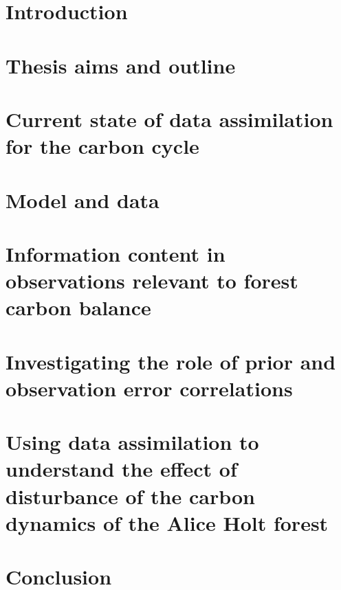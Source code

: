 




\tableofcontents


\chapter{Introduction}
\label{chap:intro}


\chapter{Thesis aims and outline}
\label{chap:aims}


\chapter{Current state of data assimilation for the carbon cycle}
\label{chap:litrev}


\chapter{Model and data}
\label{chap:data}


\chapter{Information content in observations relevant to forest carbon balance}
\label{chap:info_con}


\chapter{Investigating the role of prior and observation error correlations}
\label{chap:error_corrs}


\chapter{Using data assimilation to understand the effect of disturbance of the carbon dynamics of the Alice Holt forest}
\label{chap:disturbance}



\chapter{Conclusion}
\label{chap:conclusion}


\newpage
{}
\def\rightmark{Bibliography}
\def\leftmark{Bibliography}
\renewcommand*{\bibname}{\centerline{\Huge{\bfseries{\scshape{Bibliography}}}}}

%



